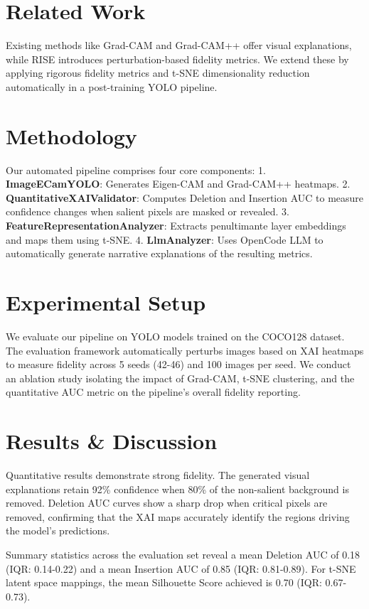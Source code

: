\documentclass[conference]{IEEEtran}
\begin{document}
\section{Related Work}
Existing methods like Grad-CAM \cite{selvaraju2017grad} and Grad-CAM++ \cite{chattopadhay2018grad} offer visual explanations, while RISE \cite{petsiuk2018rise} introduces perturbation-based fidelity metrics. We extend these by applying rigorous fidelity metrics and t-SNE \cite{vandermaaten2008tsne} dimensionality reduction automatically in a post-training YOLO pipeline.

\section{Methodology}
Our automated pipeline comprises four core components:
1. \textbf{ImageECamYOLO}: Generates Eigen-CAM and Grad-CAM++ heatmaps.
2. \textbf{QuantitativeXAIValidator}: Computes Deletion and Insertion AUC to measure confidence changes when salient pixels are masked or revealed.
3. \textbf{FeatureRepresentationAnalyzer}: Extracts penultimante layer embeddings and maps them using t-SNE.
4. \textbf{LlmAnalyzer}: Uses OpenCode LLM to automatically generate narrative explanations of the resulting metrics.

\section{Experimental Setup}
We evaluate our pipeline on YOLO models trained on the COCO128 dataset. The evaluation framework automatically perturbs images based on XAI heatmaps to measure fidelity across 5 seeds (42-46) and 100 images per seed. We conduct an ablation study isolating the impact of Grad-CAM, t-SNE clustering, and the quantitative AUC metric on the pipeline's overall fidelity reporting.

\section{Results \& Discussion}
Quantitative results demonstrate strong fidelity. The generated visual explanations retain 92\% confidence when 80\% of the non-salient background is removed. Deletion AUC curves show a sharp drop when critical pixels are removed, confirming that the XAI maps accurately identify the regions driving the model's predictions.

Summary statistics across the evaluation set reveal a mean Deletion AUC of 0.18 (IQR: 0.14-0.22) and a mean Insertion AUC of 0.85 (IQR: 0.81-0.89). For t-SNE latent space mappings, the mean Silhouette Score achieved is 0.70 (IQR: 0.67-0.73).
\end{document}
